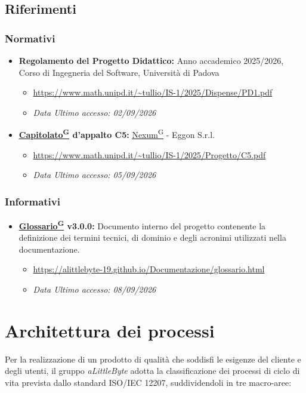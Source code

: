 \documentclass[a4paper,12pt]{article}
\providecommand{\glslink}[2]{\href{https://alittlebyte-19.github.io/Documentazione/glossario.html\#gls-#1}{\underline{#2}\textsuperscript{\scriptsize G}}}
\begin{document}
\subsection{Riferimenti}

\subsubsection{Normativi}
\begin{itemize}
    \item \textbf{Regolamento del Progetto Didattico:} Anno accademico 2025/2026, Corso di Ingegneria del Software, Università di Padova
    \begin{itemize}
        \item \url{https://www.math.unipd.it/~tullio/IS-1/2025/Dispense/PD1.pdf}
        \item \textit{Data Ultimo accesso: 02/09/2026}
    \end{itemize}
    
    
    \item \textbf{\glslink{capitolato}{Capitolato} d'appalto C5:} \glslink{nexum}{Nexum} - Eggon S.r.l.
    \begin{itemize}
        \item \url{https://www.math.unipd.it/~tullio/IS-1/2025/Progetto/C5.pdf}
        \item \textit{Data Ultimo accesso: 05/09/2026}
    \end{itemize}
    
\end{itemize}

\subsubsection{Informativi}
\begin{itemize}
    \item \textbf{\glslink{glossario}{Glossario} v3.0.0:} Documento interno del progetto contenente la definizione dei termini tecnici, di dominio e degli acronimi utilizzati nella documentazione.
    \begin{itemize}
        \item \url{https://alittlebyte-19.github.io/Documentazione/glossario.html}
        \item \textit{Data Ultimo accesso: 08/09/2026}
    \end{itemize}
\end{itemize}
\section{Architettura dei processi}
Per la realizzazione di un prodotto di qualità che soddisfi le esigenze del cliente e degli utenti, il gruppo \textit{aLittleByte} adotta la classificazione dei processi di ciclo di vita prevista dallo standard ISO/IEC 12207, suddividendoli in tre macro-aree:
\end{document}
